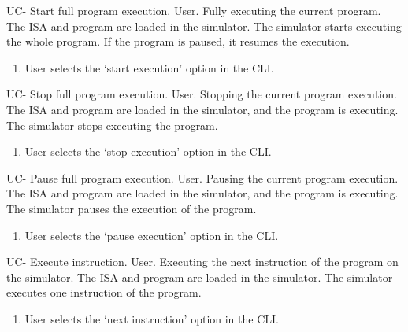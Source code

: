 \begin{useCase}{UC-}
  {Start full program execution.}  %
  {User.}  %
  {Fully executing the current program.}  %
  {The \gls{ISA} and program are loaded in the simulator.}  %
  {The simulator starts executing the whole program. If the program is paused, it resumes the execution.}  %
  \begin{enumerate}[nosep]  %
    \item User selects the `start execution' option in the \gls{CLI}.
  \end{enumerate}
\end{useCase}

\begin{useCase}{UC-}
  {Stop full program execution.}  %
  {User.}  %
  {Stopping the current program execution.}  %
  {The \gls{ISA} and program are loaded in the simulator, and the program is executing.}  %
  {The simulator stops executing the program.}  %
  \begin{enumerate}[nosep]  %
    \item User selects the `stop execution' option in the \gls{CLI}.
  \end{enumerate}
\end{useCase}

\begin{useCase}{UC-}
  {Pause full program execution.}  %
  {User.}  %
  {Pausing the current program execution.}  %
  {The \gls{ISA} and program are loaded in the simulator, and the program is executing.}  %
  {The simulator pauses the execution of the program.}  %
  \begin{enumerate}[nosep]  %
    \item User selects the `pause execution' option in the \gls{CLI}.
  \end{enumerate}
\end{useCase}

\begin{useCase}{UC-}
  {Execute instruction.}  %
  {User.}  %
  {Executing the next instruction of the program on the simulator.}  %
  {The \gls{ISA} and program are loaded in the simulator.}  %
  {The simulator executes one instruction of the program.}  %
  \begin{enumerate}[nosep]  %
    \item User selects the `next instruction' option in the \gls{CLI}.
  \end{enumerate}
\end{useCase}

